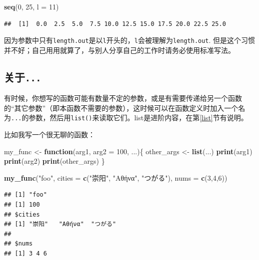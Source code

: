 \documentclass[]{book}
\newenvironment{Shaded}{\begin{snugshade}}{\end{snugshade}}
\newcommand{\ControlFlowTok}[1]{\textcolor[rgb]{0.13,0.29,0.53}{\textbf{#1}}}
\newcommand{\DataTypeTok}[1]{\textcolor[rgb]{0.13,0.29,0.53}{#1}}
\newcommand{\DecValTok}[1]{\textcolor[rgb]{0.00,0.00,0.81}{#1}}
\newcommand{\KeywordTok}[1]{\textcolor[rgb]{0.13,0.29,0.53}{\textbf{#1}}}
\newcommand{\NormalTok}[1]{#1}
\newcommand{\StringTok}[1]{\textcolor[rgb]{0.31,0.60,0.02}{#1}}
\begin{document}
\begin{Shaded}
\begin{Highlighting}[]
\KeywordTok{seq}\NormalTok{(}\DecValTok{0}\NormalTok{, }\DecValTok{25}\NormalTok{, }\DataTypeTok{l =} \DecValTok{11}\NormalTok{)}
\end{Highlighting}
\end{Shaded}

\begin{verbatim}
##  [1]  0.0  2.5  5.0  7.5 10.0 12.5 15.0 17.5 20.0 22.5 25.0
\end{verbatim}

因为参数中只有\texttt{length.out}是以\texttt{l}开头的，\texttt{l}会被理解为\texttt{length.out}. 但是这个习惯并不好；自己用用就算了，与别人分享自己的工作时请务必使用标准写法。

\hypertarget{...}{%
\subsection{\texorpdfstring{关于\texttt{...}}{关于...}}\label{...}}

有时候，你想写的函数可能有数量不定的参数，或是有需要传递给另一个函数的``其它参数''（即本函数不需要的参数），这时候可以在函数定义时加入一个名为\texttt{...}的参数，然后用\texttt{list()}来读取它们。list是进阶内容，在第\ref{list}节有说明。

比如我写一个很无聊的函数：

\begin{Shaded}
\begin{Highlighting}[]
\NormalTok{my_func <-}\StringTok{ }\ControlFlowTok{function}\NormalTok{(arg1, }\DataTypeTok{arg2 =} \DecValTok{100}\NormalTok{, ...)\{}
\NormalTok{  other_args <-}\StringTok{ }\KeywordTok{list}\NormalTok{(...)}
  \KeywordTok{print}\NormalTok{(arg1)}
  \KeywordTok{print}\NormalTok{(arg2)}
  \KeywordTok{print}\NormalTok{(other_args)}
\NormalTok{\}}

\KeywordTok{my_func}\NormalTok{(}\StringTok{"foo"}\NormalTok{, }\DataTypeTok{cities =} \KeywordTok{c}\NormalTok{(}\StringTok{"崇阳"}\NormalTok{, }\StringTok{"Αθήνα"}\NormalTok{, }\StringTok{"つがる"}\NormalTok{), }\DataTypeTok{nums =} \KeywordTok{c}\NormalTok{(}\DecValTok{3}\NormalTok{,}\DecValTok{4}\NormalTok{,}\DecValTok{6}\NormalTok{))}
\end{Highlighting}
\end{Shaded}

\begin{verbatim}
## [1] "foo"
## [1] 100
## $cities
## [1] "崇阳"   "Αθήνα"  "つがる"
## 
## $nums
## [1] 3 4 6
\end{verbatim}
\end{document}
